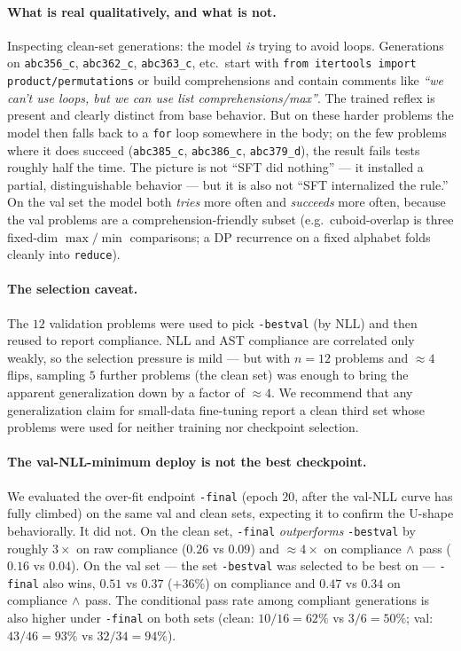 \documentclass[11pt]{article}
\begin{document}
\paragraph{What is real qualitatively, and what is not.}
Inspecting clean-set generations: the model \emph{is} trying to avoid loops. Generations on \texttt{abc356\_c}, \texttt{abc362\_c}, \texttt{abc363\_c}, etc.\ start with \texttt{from itertools import product/permutations} or build comprehensions and contain comments like \emph{``we can't use loops, but we can use list comprehensions/max''}. The trained reflex is present and clearly distinct from base behavior. But on these harder problems the model then falls back to a \texttt{for} loop somewhere in the body; on the few problems where it does succeed (\texttt{abc385\_c}, \texttt{abc386\_c}, \texttt{abc379\_d}), the result fails tests roughly half the time. The picture is not ``SFT did nothing'' --- it installed a partial, distinguishable behavior --- but it is also not ``SFT internalized the rule.'' On the val set the model both \emph{tries} more often and \emph{succeeds} more often, because the val problems are a comprehension-friendly subset (e.g.\ cuboid-overlap is three fixed-dim $\max/\min$ comparisons; a DP recurrence on a fixed alphabet folds cleanly into \texttt{reduce}).

\paragraph{The selection caveat.}
The $12$ validation problems were used to pick \texttt{-bestval} (by NLL) and then reused to report compliance. NLL and AST compliance are correlated only weakly, so the selection pressure is mild --- but with $n=12$ problems and $\approx 4$ flips, sampling $5$ further problems (the clean set) was enough to bring the apparent generalization down by a factor of $\approx 4$. We recommend that any generalization claim for small-data fine-tuning report a clean third set whose problems were used for neither training nor checkpoint selection.

\paragraph{The val-NLL-minimum deploy is not the best checkpoint.}
We evaluated the over-fit endpoint \texttt{-final} (epoch $20$, after the val-NLL curve has fully climbed) on the same val and clean sets, expecting it to confirm the U-shape behaviorally. It did not. On the clean set, \texttt{-final} \emph{outperforms} \texttt{-bestval} by roughly $3\times$ on raw compliance ($0.26$ vs $0.09$) and $\approx 4\times$ on compliance$\,\wedge\,$pass ($0.16$ vs $0.04$). On the val set --- the set \texttt{-bestval} was selected to be best on --- \texttt{-final} also wins, $0.51$ vs $0.37$ ($+36\%$) on compliance and $0.47$ vs $0.34$ on compliance$\,\wedge\,$pass. The conditional pass rate among compliant generations is also higher under \texttt{-final} on both sets (clean: $10/16 = 62\%$ vs $3/6 = 50\%$; val: $43/46 = 93\%$ vs $32/34 = 94\%$).
\end{document}
